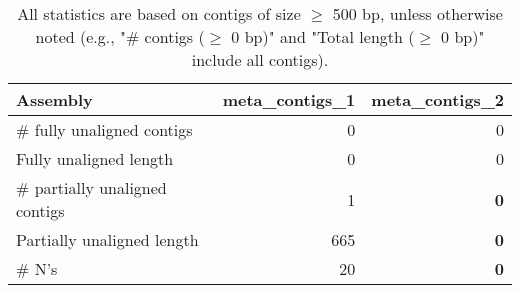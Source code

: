 \documentclass[12pt,a4paper]{article}
\begin{document}
\begin{table}[ht]
\begin{center}
\caption{All statistics are based on contigs of size $\geq$ 500 bp, unless otherwise noted (e.g., "\# contigs ($\geq$ 0 bp)" and "Total length ($\geq$ 0 bp)" include all contigs).}
\begin{tabular}{|l*{2}{|r}|}
\hline
Assembly & meta\_contigs\_1 & meta\_contigs\_2 \\ \hline
\# fully unaligned contigs & 0 & 0 \\ \hline
Fully unaligned length & 0 & 0 \\ \hline
\# partially unaligned contigs & 1 & {\bf 0} \\ \hline
Partially unaligned length & 665 & {\bf 0} \\ \hline
\# N's & 20 & {\bf 0} \\ \hline
\end{tabular}
\end{center}
\end{table}
\end{document}
